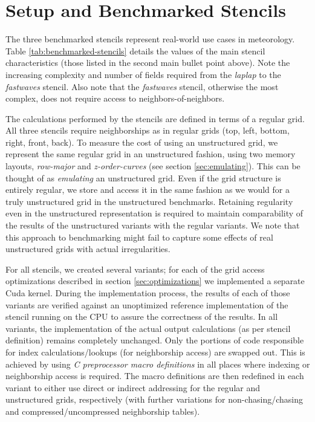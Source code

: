 \section{Setup and Benchmarked Stencils}\label{sec:benchmark-setup}

The three benchmarked stencils represent real-world use cases in meteorology. Table \ref{tab:benchmarked-stencils} details the values of the main stencil characteristics (those listed in the second main bullet point above). Note the increasing complexity and number of fields required from the \emph{laplap} to the \emph{fastwaves} stencil. Also note that the \emph{fastwaves} stencil, otherwise the most complex, does not require access to neighbors-of-neighbors.

The calculations performed by the stencils are defined in terms of a regular grid. All three stencils require neighborships as in regular grids (top, left, bottom, right, front, back). To measure the cost of using an unstructured grid, we represent the same regular grid in an unstructured fashion, using two memory layouts, \emph{row-major} and \emph{z-order-curves} (see section \ref{sec:emulating}). This can be thought of as \emph{emulating} an unstructured grid. Even if the grid structure is entirely regular, we store and access it in the same fashion as we would for a truly unstructured grid in the unstructured benchmarks. Retaining regularity even in the unstructured representation is required to maintain comparability of the results of the unstructured variants with the regular variants. We note that this approach to benchmarking might fail to capture some effects of real unstructured grids with actual irregularities.

For all stencils, we created several variants; for each of the grid access optimizations described in section \ref{sec:optimizations} we implemented a separate Cuda kernel. During the implementation process, the results of each of those variants are verified against an unoptimized reference implementation of the stencil running on the CPU to assure the correctness of the results. In all variants, the implementation of the actual output calculations (as per stencil definition) remains completely unchanged. Only the portions of code responsible for index calculations/lookups (for neighborship access) are swapped out. This is achieved by using \emph{C preprocessor macro definitions} in all places where indexing or neighborship access is required. The macro definitions are then redefined in each variant to either use direct or indirect addressing for the regular and unstructured grids, respectively (with further variations for non-chasing/chasing and compressed/uncompressed neighborship tables).

